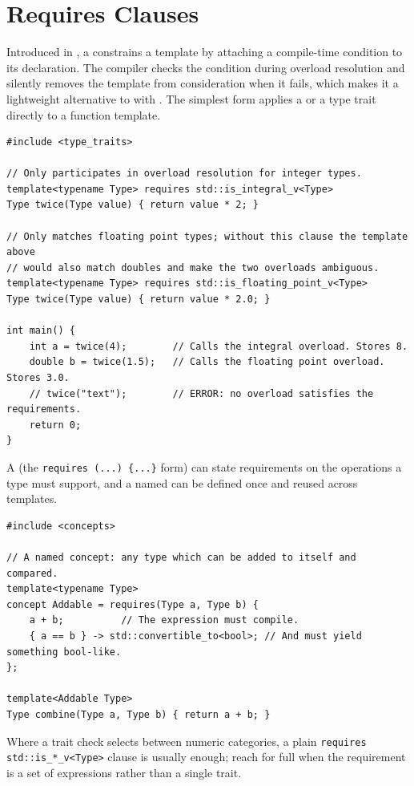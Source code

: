 \section{Requires Clauses}
Introduced in , a  constrains a template by attaching a compile-time condition to its declaration. The compiler checks the condition during overload resolution and silently removes the template from consideration when it fails, which makes it a lightweight alternative to  with . The simplest form applies a  or a type trait directly to a function template.
\begin{lstlisting}
#include <type_traits>

// Only participates in overload resolution for integer types.
template<typename Type> requires std::is_integral_v<Type>
Type twice(Type value) { return value * 2; }

// Only matches floating point types; without this clause the template above
// would also match doubles and make the two overloads ambiguous.
template<typename Type> requires std::is_floating_point_v<Type>
Type twice(Type value) { return value * 2.0; }

int main() {
    int a = twice(4);        // Calls the integral overload. Stores 8.
    double b = twice(1.5);   // Calls the floating point overload. Stores 3.0.
    // twice("text");        // ERROR: no overload satisfies the requirements.
    return 0;
}
\end{lstlisting}
A  (the \texttt{requires (...) \{...\}} form) can state requirements on the operations a type must support, and a named  can be defined once and reused across templates.
\begin{lstlisting}
#include <concepts>

// A named concept: any type which can be added to itself and compared.
template<typename Type>
concept Addable = requires(Type a, Type b) {
    a + b;          // The expression must compile.
    { a == b } -> std::convertible_to<bool>; // And must yield something bool-like.
};

template<Addable Type>
Type combine(Type a, Type b) { return a + b; }
\end{lstlisting}
Where a trait check selects between numeric categories, a plain \texttt{requires std::is\_*\_v<Type>} clause is usually enough; reach for full  when the requirement is a set of expressions rather than a single trait.



